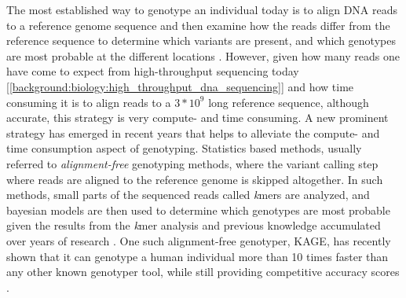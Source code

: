 The most established way to genotype an individual today is to align DNA reads to a reference genome sequence and then examine how the reads differ from the reference sequence to determine which variants are present, and which genotypes are most probable at the different locations \cite{gatk}.
However, given how many reads one have come to expect from high-throughput sequencing today [\ref{background:biology:high_throughput_dna_sequencing}] and how time consuming it is to align reads to a $3*10^9$ long reference sequence, although accurate, this strategy is very compute- and time consuming.
A new prominent strategy has emerged in recent years that helps to alleviate the compute- and time consumption aspect of genotyping.
Statistics based methods, usually referred to \textit{alignment-free} genotyping methods, where the variant calling step where reads are aligned to the reference genome is skipped altogether. 
In such methods, small parts of the sequenced reads called \textit{k}mers are analyzed, and bayesian models are then used to determine which genotypes are most probable given the results from the \textit{k}mer analysis and previous knowledge accumulated over years of research \cite{kage,malva,1000_genomes_project}.
One such alignment-free genotyper, KAGE, has recently shown that it can genotype a human individual more than 10 times faster than any other known genotyper tool, while still providing competitive accuracy scores \cite{kage}.
